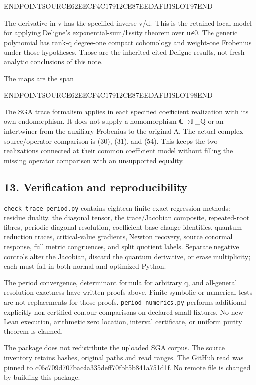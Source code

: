 ENDPOINTSOURCE62EECF4C17912CE87EEDAFB1SLOT97END

The derivative in v has the specified inverse v/d.~This is the retained local model for applying Deligne's exponential-sum/lissity theorem over u≠0. The generic polynomial has rank-q degree-one compact cohomology and weight-one Frobenius under those hypotheses. Those are the inherited cited Deligne results, not fresh analytic conclusions of this note.

The maps are the span

ENDPOINTSOURCE62EECF4C17912CE87EEDAFB1SLOT98END

The SGA trace formalism applies in each specified coefficient realization with its own endomorphism. It does not supply a homomorphism ℂ→𝔽\_Q or an intertwiner from the auxiliary Frobenius to the original A. The actual complex source/operator comparison is (30), (31), and (54). This keeps the two realizations connected at their common coefficient model without filling the missing operator comparison with an unsupported equality.

\subsection{13. Verification and reproducibility}\label{endpoint-sga_trace_period--verification-and-reproducibility}

\texttt{check\_trace\_period.py} contains eighteen finite exact regression methods: residue duality, the diagonal tensor, the trace/Jacobian composite, repeated-root fibres, periodic diagonal resolution, coefficient-base-change identities, quantum-reduction traces, critical-value gradients, Newton recovery, source conormal response, full metric congruences, and split quotient labels. Separate negative controls alter the Jacobian, discard the quantum derivative, or erase multiplicity; each must fail in both normal and optimized Python.

The period convergence, determinant formula for arbitrary q, and all-general resolution exactness have written proofs above. Finite symbolic or numerical tests are not replacements for those proofs. \texttt{period\_numerics.py} performs additional explicitly non-certified contour comparisons on declared small fixtures. No new Lean execution, arithmetic zero location, interval certificate, or uniform purity theorem is claimed.

The package does not redistribute the uploaded SGA corpus. The source inventory retains hashes, original paths and read ranges. The GitHub read was pinned to c05c709d707bacda335deff70fbb5b841a751d1f. No remote file is changed by building this package.

